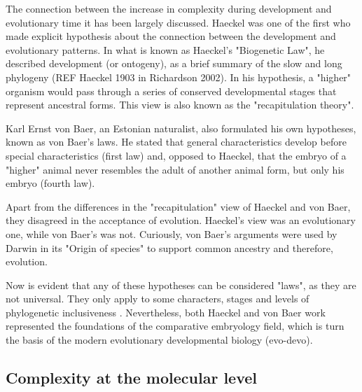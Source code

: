 \clearpage
\begin{mdframed}[style=boxstyle,frametitle={Box1. On the similarity of complexity patterns between Evolution and Development}]\label{Box1:Haeckel&vonBaer}

The connection between the increase in complexity during development and evolutionary time it has been largely discussed.
Haeckel was one of the first who made explicit hypothesis about the connection between the development and evolutionary patterns.
In what is known as Haeckel's "Biogenetic Law", he described development (or ontogeny), as a brief summary of the slow and long phylogeny (REF Haeckel 1903 in Richardson 2002).
In his hypothesis, a "higher" organism would pass through a series of conserved developmental stages that represent ancestral forms. This view is also known as the "recapitulation theory".

Karl Ernst von Baer, an Estonian naturalist, also formulated his own hypotheses, known as von Baer's laws. He stated that general characteristics develop before special characteristics (first law) and, opposed to Haeckel, that the embryo of a "higher" animal never resembles the adult of another animal form, but only his embryo (fourth law). 

Apart from the differences in the "recapitulation" view of Haeckel and von Baer\citep{Richardson2002}, they disagreed in the acceptance of evolution. 
Haeckel's view was an evolutionary one, while von Baer's was not. Curiously, von Baer's arguments were used by Darwin in its "Origin of species" to support common ancestry and therefore, evolution.

Now is evident that any of these hypotheses can be considered "laws", as they are not universal. They only apply to some characters, stages and levels of phylogenetic inclusiveness \citep{Richardson2002}. Nevertheless, both Haeckel and von Baer work represented the foundations of the comparative embryology field, which is turn the basis of the modern evolutionary developmental biology (evo-devo).
\end{mdframed}


	

\subsection{Complexity at the molecular level}

